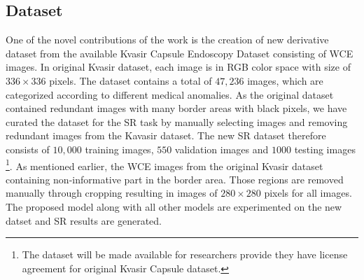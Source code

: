 \documentclass[conference]{IEEEtran}
\begin{document}
\subsection{Dataset}
One of the novel contributions of the work is the creation of new derivative dataset from the available Kvasir Capsule Endoscopy Dataset \cite{data} consisting of WCE images.  
In original Kvasir dataset, each image is in RGB color space with size of $336\times336$ pixels. The dataset contains a total of $47,236$ images, which are categorized according to different medical anomalies. As the original dataset contained redundant images with many border areas with black pixels, we have curated the dataset for the SR task by manually selecting images and removing redundant images from the Kavasir dataset.  %
The new SR dataset therefore consists of $10,000$ training images, $550$ validation images and $1000$ testing images \footnote{The dataset will be made available for researchers provide they have license agreement for original Kvasir Capsule dataset.}. As mentioned earlier, the WCE images from the original Kvasir dataset containing non-informative part in the border area. Those regions are removed manually through cropping resulting in images of $280\times280$ pixels for all images. The proposed model along with all other models are experimented on the new datset and SR results are generated.
\end{document}
